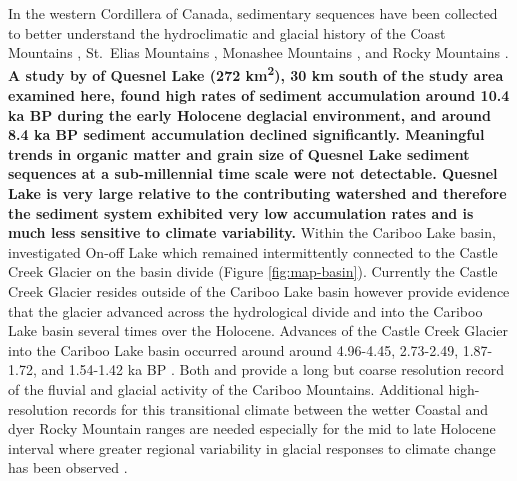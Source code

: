 \documentclass[Royal,times,doublespace,sageh]{sagej}
\begin{document}
In the western Cordillera of Canada, sedimentary sequences have been
collected to better understand the hydroclimatic and glacial history of
the Coast Mountains \citep{Menounos2008c}, St.~Elias Mountains
\citep{Crookshanks2008}, Monashee Mountains \citep{Hodder2006b}, and
Rocky Mountains \citep{Leonard1986, Dirszowsky1997a, Desloges1999}.
\textbf{A study by \citet{Gilbert2012} of Quesnel Lake (272
km\textsuperscript{2}), 30 km south of the study area examined here,
found high rates of sediment accumulation around 10.4 ka BP during the
early Holocene deglacial environment, and around 8.4 ka BP sediment
accumulation declined significantly. Meaningful trends in organic matter
and grain size of Quesnel Lake sediment sequences at a sub-millennial
time scale were not detectable. Quesnel Lake is very large relative to
the contributing watershed and therefore the sediment system exhibited
very low accumulation rates and is much less sensitive to climate
variability.} Within the Cariboo Lake basin, \citet{Maurer2012b}
investigated On-off Lake which remained intermittently connected to the
Castle Creek Glacier on the basin divide (Figure \ref{fig:map-basin}).
Currently the Castle Creek Glacier resides outside of the Cariboo Lake
basin however \citet{Maurer2012b} provide evidence that the glacier
advanced across the hydrological divide and into the Cariboo Lake basin
several times over the Holocene. Advances of the Castle Creek Glacier
into the Cariboo Lake basin occurred around around 4.96-4.45, 2.73-2.49,
1.87-1.72, and 1.54-1.42 ka BP \citep{Maurer2012b}. Both
\citet{Gilbert2012} and \citet{Maurer2012b} provide a long but coarse
resolution record of the fluvial and glacial activity of the Cariboo
Mountains. Additional high-resolution records for this transitional
climate between the wetter Coastal and dyer Rocky Mountain ranges are
needed especially for the mid to late Holocene interval where greater
regional variability in glacial responses to climate change has been
observed \citep{Menounos2009b}.
\end{document}
